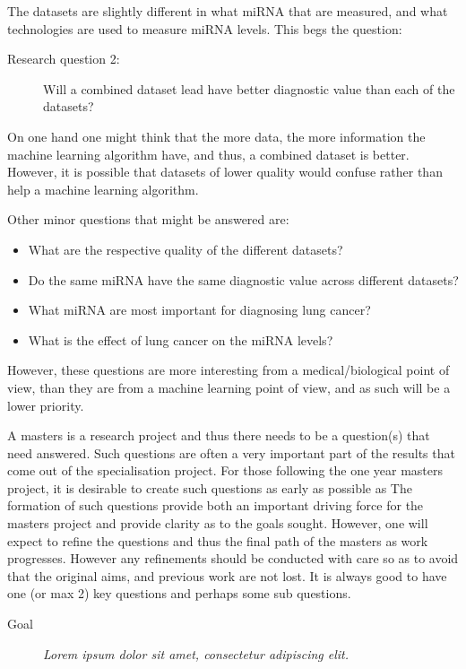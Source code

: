 The datasets are slightly different in what miRNA that are measured, and what technologies are used to measure miRNA levels. This begs the question:

\begin{description}
\item[Research question 2:] Will a combined dataset lead have better diagnostic value than each of the datasets?
\end{description}

On one hand one might think that the more data, the more information the machine learning algorithm have, and thus, a combined dataset is better. However, it is possible that datasets of lower quality would confuse rather than help a machine learning algorithm.

Other minor questions that might be answered are:
\begin{itemize}
    \item What are the respective quality of the different datasets?
    \item Do the same miRNA have the same diagnostic value across different datasets?
    \item What miRNA are most important for diagnosing lung cancer?
    \item What is the effect of lung cancer on the miRNA levels?
\end{itemize}

However, these questions are more interesting from a medical/biological point of view, than they are from a machine learning point of view, and as such will be a lower priority.

\iffalse
A masters is a research project and thus there needs to be a question(s) that need answered. Such questions are often a very important part of the results that come out of the specialisation project. For those following the one year masters project, it is desirable to create such questions as early as possible as   The formation of such questions provide both an important driving force for the masters project and provide clarity as to the goals sought. However, one will expect to refine the questions and thus the final path of the masters as work progresses. However any refinements should be conducted with care so as to avoid that the original aims, and previous work are not lost.  
It is always good to have one (or max 2) key questions and perhaps some sub questions. 

\begin{description}
\item[Goal] {\it Lorem ipsum dolor sit amet, consectetur adipiscing elit.}
\end{description}

